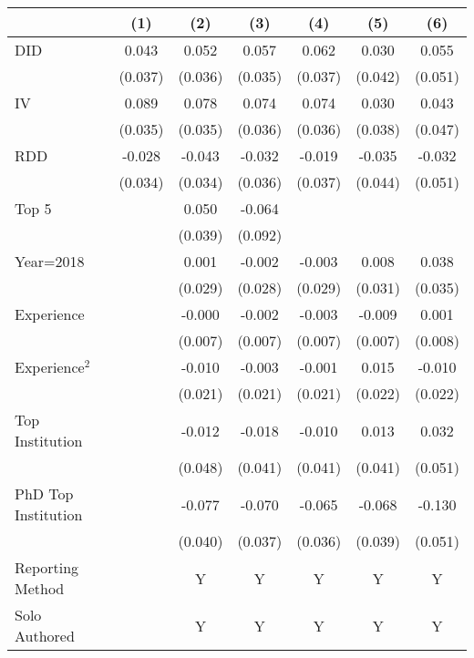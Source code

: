 \begin{tabular}{l*{6}{c}}
\hline\hline
                &\multicolumn{1}{c}{(1)}&\multicolumn{1}{c}{(2)}&\multicolumn{1}{c}{(3)}&\multicolumn{1}{c}{(4)}&\multicolumn{1}{c}{(5)}&\multicolumn{1}{c}{(6)}\\
\hline
DID             &    0.043&    0.052&    0.057&    0.062&    0.030&    0.055\\
                &  (0.037)&  (0.036)&  (0.035)&  (0.037)&  (0.042)&  (0.051)\\
IV              &    0.089&    0.078&    0.074&    0.074&    0.030&    0.043\\
                &  (0.035)&  (0.035)&  (0.036)&  (0.036)&  (0.038)&  (0.047)\\
RDD             &   -0.028&   -0.043&   -0.032&   -0.019&   -0.035&   -0.032\\
                &  (0.034)&  (0.034)&  (0.036)&  (0.037)&  (0.044)&  (0.051)\\
Top 5           &         &    0.050&   -0.064&         &         &         \\
                &         &  (0.039)&  (0.092)&         &         &         \\
Year=2018       &         &    0.001&   -0.002&   -0.003&    0.008&    0.038\\
                &         &  (0.029)&  (0.028)&  (0.029)&  (0.031)&  (0.035)\\
Experience      &         &   -0.000&   -0.002&   -0.003&   -0.009&    0.001\\
                &         &  (0.007)&  (0.007)&  (0.007)&  (0.007)&  (0.008)\\
Experience$^2$  &         &   -0.010&   -0.003&   -0.001&    0.015&   -0.010\\
                &         &  (0.021)&  (0.021)&  (0.021)&  (0.022)&  (0.022)\\
Top Institution &         &   -0.012&   -0.018&   -0.010&    0.013&    0.032\\
                &         &  (0.048)&  (0.041)&  (0.041)&  (0.041)&  (0.051)\\
PhD Top Institution&         &   -0.077&   -0.070&   -0.065&   -0.068&   -0.130\\
                &         &  (0.040)&  (0.037)&  (0.036)&  (0.039)&  (0.051)\\
Reporting Method &         &        Y&        Y&        Y&        Y&        Y\\
Solo Authored   &         &        Y&        Y&        Y&        Y&        Y\\

\end{tabular}
